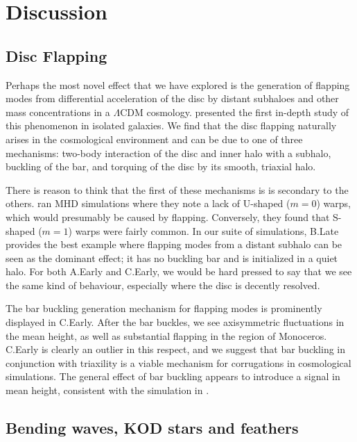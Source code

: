 \section{Discussion} \label{sec:discussion}

\subsection{Disc Flapping}

Perhaps the most novel effect that we have explored is the generation
of flapping modes from differential acceleration of the disc by
distant subhaloes and other mass concentrations in a $\Lambda$CDM cosmology.
\citet{sellwood_1996} presented the first in-depth study
of this phenomenon in isolated galaxies. We find that the disc
flapping naturally arises in the cosmological environment and can be
due to one of three mechanisms: two-body interaction of the 
disc and inner halo with a subhalo, buckling of the bar,
and torquing of the disc by its smooth, triaxial halo.

There is reason to think that the first of these mechanisms is is
secondary to the others. \citet{gomez_2017} ran MHD simulations
where they note a lack of U-shaped ($m=0$) warps, which would
presumably be caused by flapping. Conversely, they found that S-shaped
($m=1$) warps were fairly common. In our suite of simulations, B.Late
provides the best example where flapping modes from a distant subhalo can be seen as the
dominant effect; it has no buckling bar and is initialized in a quiet
halo. For both A.Early and C.Early, we would be hard pressed to say
that we see the same kind of behaviour, especially where the disc is
decently resolved.

The bar buckling generation mechanism for flapping modes is
prominently displayed in C.Early. After the bar buckles, we see
axisymmetric fluctuations in the mean height, as well as substantial
flapping in the region of Monoceros. C.Early is clearly an outlier in
this respect, and we suggest that bar buckling in conjunction with
triaxility is a viable mechanism for corrugations in cosmological
simulations. The general effect of bar buckling appears to introduce a
signal in mean height, consistent with the simulation in
\citet{bar_buckling_echo}.

\subsection{Bending waves, KOD stars and feathers}


